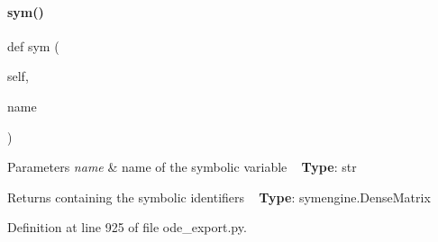 \paragraph{\texorpdfstring{sym()}{sym()}}
{\footnotesize\ttfamily def sym (\begin{DoxyParamCaption}\item[{}]{self,  }\item[{}]{name }\end{DoxyParamCaption})}


\begin{DoxyParams}{Parameters}
{\em name} & name of the symbolic variable ~\newline
{\bfseries Type}\+: str\\
\hline
\end{DoxyParams}
\begin{DoxyReturn}{Returns}
containing the symbolic identifiers ~\newline
{\bfseries Type}\+: symengine.\+Dense\+Matrix 
\end{DoxyReturn}


Definition at line 925 of file ode\+\_\+export.\+py.

